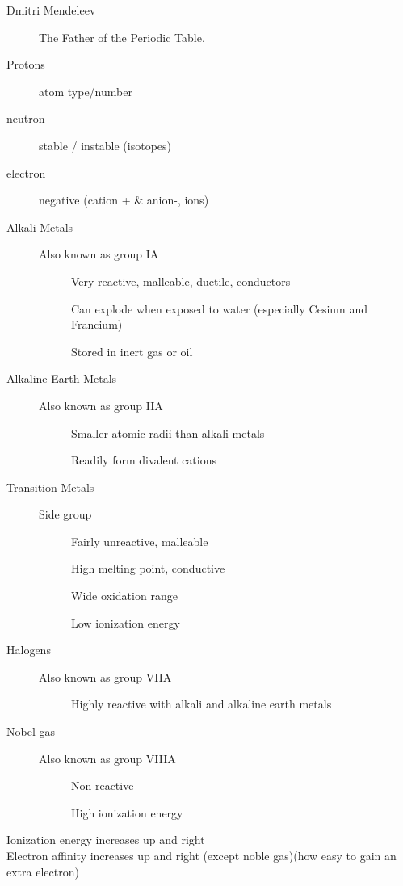 \begin{description}
    \item[Dmitri Mendeleev] The Father of the Periodic Table.
    \item[Protons] atom type/number
    \item[neutron] stable / instable (isotopes)
    \item[electron] negative (cation + \& anion-, ions)
    \item[Alkali Metals] Also known as group IA
    \begin{description} 
        \item[] Very reactive, malleable, ductile, conductors
        \item[] Can explode when exposed to water (especially Cesium and Francium)
        \item[] Stored in inert gas or oil
    \end{description}
    \item[Alkaline Earth Metals] Also known as group IIA
    \begin{description} 
        \item[] Smaller atomic radii than alkali metals
        \item[] Readily form divalent cations
    \end{description} 
    \item[Transition Metals] Side group
    \begin{description} 
        \item[] Fairly unreactive, malleable
        \item[] High melting point, conductive
        \item[] Wide oxidation range
        \item[] Low ionization energy
    \end{description}
    \item[Halogens] Also known as group VIIA
    \begin{description}
        \item[] Highly reactive with alkali and alkaline earth metals
    \end{description}
    \item[Nobel gas] Also known as group VIIIA
    \begin{description}
        \item[] Non-reactive
        \item[] High ionization energy
    \end{description}
\end{description}
%
Ionization energy increases up and right\\ 
Electron affinity increases up and right (except noble gas)(how easy to gain an extra electron)
